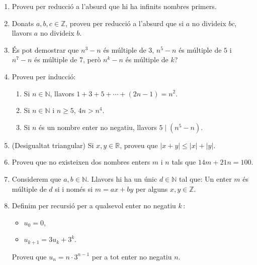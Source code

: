 \begin{enumerate}
\begin{enumerate}
\item Si $a\neq0$, aleshores $ab$ és irracional.
\end{enumerate}

\item Proveu per reducció a l'absurd que hi ha infinits nombres primers.

\item Donats $a,b,c\in\mathbb{Z}$, proveu per reducció a l'absurd que si
$a$ no divideix $bc$, llavors $a$ no divideix $b$.

\item És pot demostrar que $n^{3}-n$ és múltiple de 3, $n^{5}-n$
és múltiple de $5$ i $n^{7}-n$ és múltiple de 7, però
$n^{k}-n$ és múltiple de $k$?

\item Proveu per inducció:

\begin{enumerate}
\item Si $n\in\mathbb{N}$, llavors $1+3+5+\cdots+\left(  2n-1\right)  =n^{2}$.

\item Si $n\in\mathbb{N}$ i $n\geq5$, $4n>n^{4}$.

\item Si $n$ és un nombre enter no negatiu, llavors $5\mid\left(
n^{5}-n\right)  $.
\end{enumerate}

\item (Desigualtat triangular) Si $x,y\in\mathbb{R}$, proveu que $\left\vert
x+y\right\vert \leq\left\vert x\right\vert +\left\vert y\right\vert $.

\item Proveu que no existeixen dos nombres enters $m$ i $n$ tals que
$14m+21n=100$.

\item Considerem que $a,b\in\mathbb{N}$. Llavors hi ha un únic
$d\in\mathbb{N}$ tal que: Un enter $m$ és múltiple de $d$ si i
només si $m=ax+by$ per alguns $x,y\in\mathbb{Z}$.

\item Definim per recursió per a qualsevol enter no negatiu $k\,:$

\begin{itemize}
\item $u_{0}=0$,

\item $u_{k+1}=3u_{k}+3^{k}$.
\end{itemize}

Proveu que $u_{n}=n\cdot3^{n-1}$ per a tot enter no negatiu $n$.


\end{enumerate}
